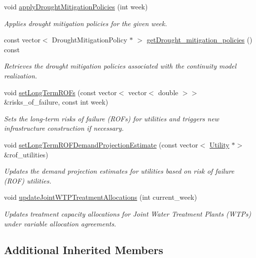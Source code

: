 \begin{DoxyCompactItemize}
void \mbox{\hyperlink{classContinuityModelRealization_a1841f4ca49c150cf5d790f6d42496575}{apply\+Drought\+Mitigation\+Policies}} (int week)
\begin{DoxyCompactList}\small\item\em Applies drought mitigation policies for the given week. \end{DoxyCompactList}\item 
const vector$<$ Drought\+Mitigation\+Policy $\ast$ $>$ \mbox{\hyperlink{classContinuityModelRealization_afadb3e7f51ae7a09948ffc73d7eb7f6b}{get\+Drought\+\_\+mitigation\+\_\+policies}} () const
\begin{DoxyCompactList}\small\item\em Retrieves the drought mitigation policies associated with the continuity model realization. \end{DoxyCompactList}\item 
void \mbox{\hyperlink{classContinuityModelRealization_aa0168985144d26e1613cf20335affedb}{set\+Long\+Term\+R\+O\+Fs}} (const vector$<$ vector$<$ double $>$$>$ \&risks\+\_\+of\+\_\+failure, const int week)
\begin{DoxyCompactList}\small\item\em Sets the long-\/term risks of failure (R\+O\+Fs) for utilities and triggers new infrastructure construction if necessary. \end{DoxyCompactList}\item 
void \mbox{\hyperlink{classContinuityModelRealization_a5b9405156e8cc21c8781ea15ee46c8fe}{set\+Long\+Term\+R\+O\+F\+Demand\+Projection\+Estimate}} (const vector$<$ \mbox{\hyperlink{classUtility}{Utility}} $\ast$$>$ \&rof\+\_\+utilities)
\begin{DoxyCompactList}\small\item\em Updates the demand projection estimates for utilities based on risk of failure (R\+OF) utilities. \end{DoxyCompactList}\item 
void \mbox{\hyperlink{classContinuityModelRealization_ab87c140eaf87266ca81636059e948bb7}{update\+Joint\+W\+T\+P\+Treatment\+Allocations}} (int current\+\_\+week)
\begin{DoxyCompactList}\small\item\em Updates treatment capacity allocations for Joint Water Treatment Plants (W\+T\+Ps) under variable allocation agreements. \end{DoxyCompactList}\end{DoxyCompactItemize}
\subsection*{Additional Inherited Members}


